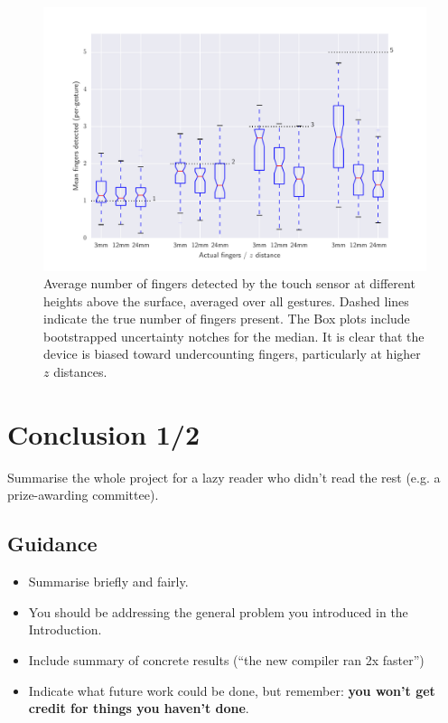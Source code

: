 \documentclass{l4proj}
\begin{document}
\begin{figure}
  \centering
  \includegraphics[width=1.0\linewidth]{images/boxplot_finger_distance.pdf}   

  \caption{Average number of fingers detected by the touch sensor at different heights above the surface, averaged over all gestures. Dashed lines indicate
  the true number of fingers present. The Box plots include bootstrapped uncertainty notches for the median. It is clear that the device is biased toward 
  undercounting fingers, particularly at higher $z$ distances.
  }

  \label{fig:boxplot} 
\end{figure}


\chapter{Conclusion 1/2}   
Summarise the whole project for a lazy reader who didn't read the rest (e.g. a prize-awarding committee).
\section{Guidance}
\begin{itemize}
  \item
    Summarise briefly and fairly.
  \item
    You should be addressing the general problem you introduced in the
    Introduction.     
  \item
    Include summary of concrete results (``the new compiler ran 2x
    faster'')
  \item
    Indicate what future work could be done, but remember: \textbf{you
    won't get credit for things you haven't done}.
\end{itemize}
\end{document}
